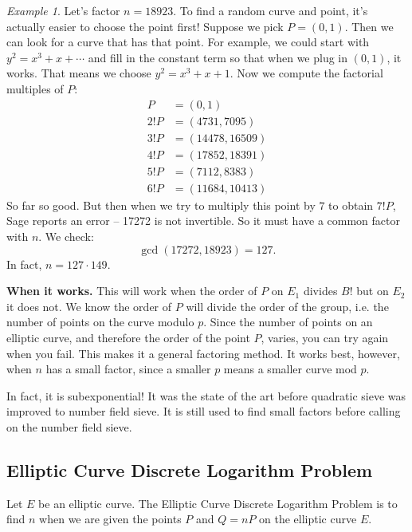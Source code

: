 \documentclass{article}
\theoremstyle{plain}
\theoremstyle{definition}
\theoremstyle{remark}
\newtheorem{example}[theorem]{Example}
\numberwithin{theorem}{section}
\begin{document}
\begin{example}
    Let's factor $n=18923$.  To find a random curve and point, it's actually easier to choose the point first!  Suppose we pick $P = (0,1)$.  Then we can look for a curve that has that point.  For example, we could start with $y^2 = x^3 + x + \cdots$ and fill in the constant term so that when we plug in $(0,1)$, it works.  That means we choose $y^2 = x^3 + x + 1$.  Now we compute the factorial multiples of $P$:
    \begin{align*}
     P &= (0,1) \\
     2!P &= (4731, 7095) \\
     3!P &= (14478, 16509) \\
     4!P &= (17852, 18391) \\
     5!P &= (7112, 8383) \\
     6!P &= (11684, 10413)
    \end{align*}
    So far so good.  But then when we try to multiply this point by $7$ to obtain $7!P$, Sage reports an error -- 17272 is not invertible.  So it must have a common factor with $n$.  We check:
    \[
    \gcd(17272,18923) = 127. 
    \]
    In fact, $n = 127 \cdot 149$.
\end{example}


\textbf{When it works.}  This will work when the order of $P$ on $E_1$ divides $B!$ but on $E_2$ it does not.  We know the order of $P$ will divide the order of the group, i.e. the number of points on the curve modulo $p$.  Since the number of points on an elliptic curve, and therefore the order of the point $P$, varies, you can try again when you fail.  This makes it a general factoring method.  It works best, however, when $n$ has a small factor, since a smaller $p$ means a smaller curve mod $p$.

In fact, it is subexponential!  It was the state of the art before quadratic sieve was improved to number field sieve.  It is still used to find small factors before calling on the number field sieve.



\subsection{Elliptic Curve Discrete Logarithm Problem}

Let $E$ be an elliptic curve.
The Elliptic Curve Discrete Logarithm Problem is to find $n$ when we are given the points $P$ and $Q = nP$ on the elliptic curve $E$.
\end{document}

